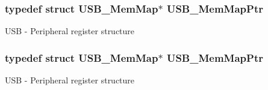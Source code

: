 \subsubsection[{\texorpdfstring{U\+S\+B\+\_\+\+Mem\+Map\+Ptr}{USB_MemMapPtr}}]{\setlength{\rightskip}{0pt plus 5cm}typedef struct {\bf U\+S\+B\+\_\+\+Mem\+Map}$\ast$ {\bf U\+S\+B\+\_\+\+Mem\+Map\+Ptr}}\hypertarget{group___u_s_b___peripheral_gaabd989a49827dc34abb5de32732f4125}{}\label{group___u_s_b___peripheral_gaabd989a49827dc34abb5de32732f4125}
U\+SB -\/ Peripheral register structure 
\subsubsection[{\texorpdfstring{U\+S\+B\+\_\+\+Mem\+Map\+Ptr}{USB_MemMapPtr}}]{\setlength{\rightskip}{0pt plus 5cm}typedef struct {\bf U\+S\+B\+\_\+\+Mem\+Map}$\ast$ {\bf U\+S\+B\+\_\+\+Mem\+Map\+Ptr}}\hypertarget{group___u_s_b___peripheral_gaabd989a49827dc34abb5de32732f4125}{}\label{group___u_s_b___peripheral_gaabd989a49827dc34abb5de32732f4125}
U\+SB -\/ Peripheral register structure 